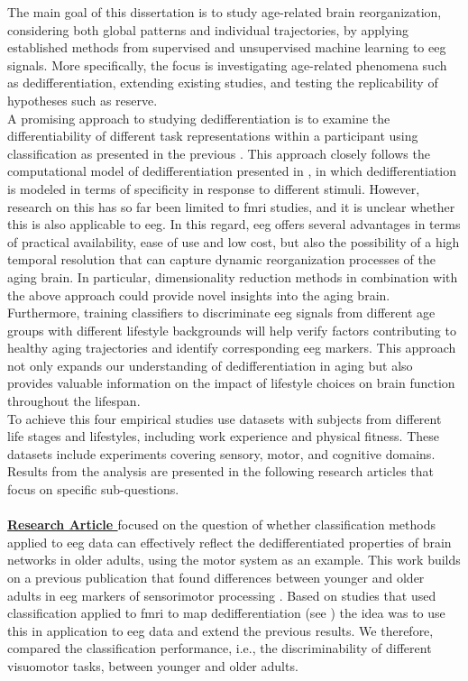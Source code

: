 The main goal of this dissertation is to study age-related brain reorganization, considering both global patterns and individual trajectories, by applying established methods from supervised and unsupervised machine learning to \gls{eeg} signals. More specifically, the focus is investigating age-related phenomena such as dedifferentiation, extending existing studies, and testing the replicability of hypotheses such as reserve.\\
A promising approach to studying dedifferentiation is to examine the differentiability of different task representations within a participant using classification as presented in the previous . This approach closely follows the computational model of dedifferentiation presented in , in which dedifferentiation is modeled in terms of specificity in response to different stimuli. However, research on this has so far been limited to \gls{fmri} studies, and it is unclear whether this is also applicable to \gls{eeg}. In this regard, \gls{eeg} offers several advantages in terms of practical availability, ease of use and low cost, but also the possibility of a high temporal resolution that can capture dynamic reorganization processes of the aging brain. In particular, dimensionality reduction methods in combination with the above approach could provide novel insights into the aging brain.  Furthermore, training classifiers to discriminate \gls{eeg} signals from different age groups with different lifestyle backgrounds will help verify factors contributing to healthy aging trajectories and identify corresponding \gls{eeg} markers. This approach not only expands our understanding of dedifferentiation in aging but also provides valuable information on the impact of lifestyle choices on brain function throughout the lifespan.\\
To achieve this four empirical studies use datasets with subjects from different life stages and lifestyles, including work experience and physical fitness. These datasets include experiments covering sensory, motor, and cognitive domains. Results from the analysis are presented in the following research articles that focus on specific sub-questions.\\
\\
\textbf{\hyperref[pub:paperI]{Research Article }} focused on the question of whether classification methods applied to \gls{eeg} data can effectively reflect the dedifferentiated properties of brain networks in older adults, using the motor system as an example. This work builds on a previous publication that found differences between younger and older adults in \gls{eeg} markers of sensorimotor processing \cite{vieluf2018age}. Based on studies that used classification applied to \gls{fmri} to map dedifferentiation (see ) the idea was to use this in application to \gls{eeg} data and extend the previous results. We therefore, compared the classification performance, i.e., the discriminability of different visuomotor tasks, between younger and older adults.\\
